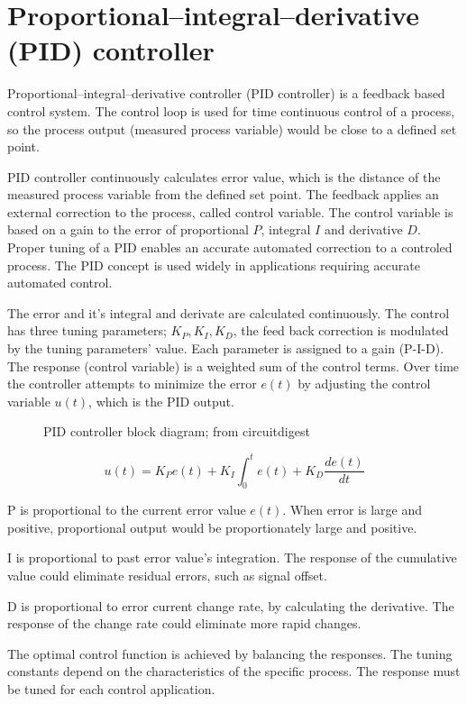 \documentclass[\main/master.tex]{subfiles}
\begin{document}
\section{Proportional–integral–derivative (PID) controller}
Proportional–integral–derivative controller (PID controller) is a feedback based control system. The control loop is used for time continuous control of a process, so the process output (measured process variable) would be close to a defined set point.
\par\noindent
PID controller continuously calculates error value, which is the distance of the measured process variable from the defined set point. The feedback applies an external correction to the process, called control variable. The control variable is based on a gain to the error of proportional $P$, integral $I$ and derivative $D$. Proper tuning of a PID enables an accurate automated correction to a controled process. The PID concept is used widely in applications requiring accurate automated control.

\par\noindent
The error and it's integral and derivate are calculated continuously. The control has three tuning parameters; $K_P, K_I, K_D$, the feed back correction is modulated by the tuning parameters' value. Each parameter is assigned to a gain (P-I-D). The response (control variable) is a weighted sum of the control terms. Over time the controller attempts to minimize the error $e(t)$ by adjusting the control variable $u(t)$, which is the PID output.
\par\noindent
\begin{figure}[htbp]
	\centering
	\caption[PID controller block diagram]{PID controller block diagram; from circuitdigest \cite{PID-diagram}}
	\label{fig:PID_scheme}
\end{figure}
\begin{equation}
u(t) = K_Pe(t)+K_I\int_{0}^{t}e(t)+K_D\frac{de(t)}{dt}   \label{eqn:PID_eq}
\end{equation}

\noindent
P is proportional to the current error value $e(t)$. When error is large and positive, proportional output would be proportionately large and positive.
\par\noindent
I is proportional to past error value's integration. The response of the cumulative value could eliminate residual errors, such as signal offset.
\par\noindent
D is proportional to error current change rate, by calculating the derivative. The response of the change rate could eliminate more rapid changes.
\par\noindent
The optimal control function is achieved by balancing the responses. The tuning constants depend on the characteristics of the specific process. The response must be tuned for each control application.  
\end{document}
